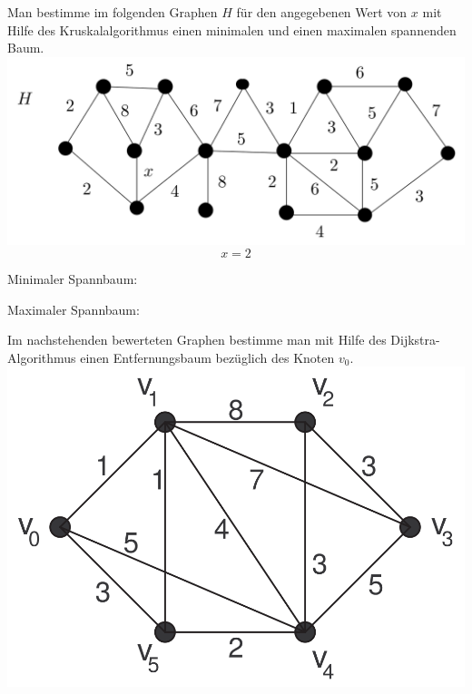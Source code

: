 \documentclass[a4paper, 12pt, margins=3cm]{homework}
\begin{document}
  \begin{problem}
    Man bestimme im folgenden Graphen $H$ für den angegebenen Wert von $x$ mit
    Hilfe des Kruskalalgorithmus einen minimalen und einen maximalen spannenden
    Baum.\\

    \centering \includegraphics[scale=0.2]{315.png}
    \[ x = 2 \]
  \end{problem}
  \begin{solution}
    Minimaler Spannbaum: \\

    \begin{center}
      \def\svgwidth{300pt} 
    \end{center}

    Maximaler Spannbaum: \\

    \begin{center}
      \def\svgwidth{300pt} 
    \end{center}
  \end{solution}


  \begin{problem}
    Im nachstehenden bewerteten Graphen bestimme man mit Hilfe des Dijkstra-Algorithmus
    einen Entfernungsbaum bezüglich des Knoten $v_0$. \\

    \centering \includegraphics[scale=0.2]{320.png}
  \end{problem}
  \begin{solution} \hfill 
    \begin{center}
      \def\svgwidth{300pt} 
    \end{center}
  \end{solution}
\end{document}
